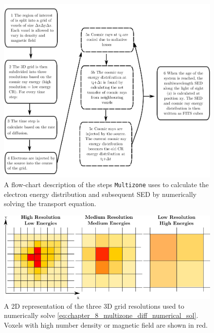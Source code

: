 \begin{figure}[h!]
    \centering
    \includegraphics[width=\textwidth]{09_Multizone/Images/code/flow_chart.png}
    \caption{A flow-chart description of the steps {\tt Multizone} uses to calculate the electron energy distribution and subsequent SED by numerically solving the transport equation.}
    \label{fig:{sec:chapter_9_multizone_flow_chart}}
\end{figure}
\begin{figure}[h!]
    \centering
    \includegraphics[width=\textwidth]{09_Multizone/Images/code/resolution_cartoon_final.png}
    \caption{A 2D representation of the three 3D grid resolutions used to numerically solve \autoref{eq:chapter_8_multizone_diff_numerical_sol}. Voxels with high number density or magnetic field are shown in red.}
    \label{fig:chapter_8_multizone_resolution_cartoon}
\end{figure}




